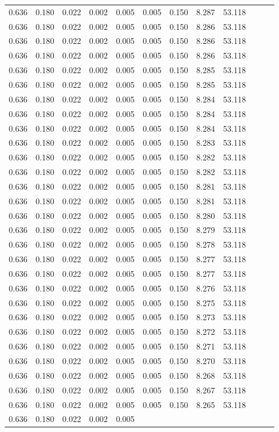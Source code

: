\begin{longtable}{rrrrrrrrrrrr}
    0.636 & 0.180 & 0.022 & 0.002 & 0.005 & 0.005 & 0.150 & 8.287 & 53.118 \\0.636 & 0.180 & 0.022 & 0.002 & 0.005 & 0.005 & 0.150 & 8.286 & 53.118 \\0.636 & 0.180 & 0.022 & 0.002 & 0.005 & 0.005 & 0.150 & 8.286 & 53.118 \\0.636 & 0.180 & 0.022 & 0.002 & 0.005 & 0.005 & 0.150 & 8.286 & 53.118 \\0.636 & 0.180 & 0.022 & 0.002 & 0.005 & 0.005 & 0.150 & 8.285 & 53.118 \\0.636 & 0.180 & 0.022 & 0.002 & 0.005 & 0.005 & 0.150 & 8.285 & 53.118 \\0.636 & 0.180 & 0.022 & 0.002 & 0.005 & 0.005 & 0.150 & 8.284 & 53.118 \\0.636 & 0.180 & 0.022 & 0.002 & 0.005 & 0.005 & 0.150 & 8.284 & 53.118 \\0.636 & 0.180 & 0.022 & 0.002 & 0.005 & 0.005 & 0.150 & 8.284 & 53.118 \\0.636 & 0.180 & 0.022 & 0.002 & 0.005 & 0.005 & 0.150 & 8.283 & 53.118 \\0.636 & 0.180 & 0.022 & 0.002 & 0.005 & 0.005 & 0.150 & 8.282 & 53.118 \\0.636 & 0.180 & 0.022 & 0.002 & 0.005 & 0.005 & 0.150 & 8.282 & 53.118 \\0.636 & 0.180 & 0.022 & 0.002 & 0.005 & 0.005 & 0.150 & 8.281 & 53.118 \\0.636 & 0.180 & 0.022 & 0.002 & 0.005 & 0.005 & 0.150 & 8.281 & 53.118 \\0.636 & 0.180 & 0.022 & 0.002 & 0.005 & 0.005 & 0.150 & 8.280 & 53.118 \\0.636 & 0.180 & 0.022 & 0.002 & 0.005 & 0.005 & 0.150 & 8.279 & 53.118 \\0.636 & 0.180 & 0.022 & 0.002 & 0.005 & 0.005 & 0.150 & 8.278 & 53.118 \\0.636 & 0.180 & 0.022 & 0.002 & 0.005 & 0.005 & 0.150 & 8.277 & 53.118 \\0.636 & 0.180 & 0.022 & 0.002 & 0.005 & 0.005 & 0.150 & 8.277 & 53.118 \\0.636 & 0.180 & 0.022 & 0.002 & 0.005 & 0.005 & 0.150 & 8.276 & 53.118 \\0.636 & 0.180 & 0.022 & 0.002 & 0.005 & 0.005 & 0.150 & 8.275 & 53.118 \\0.636 & 0.180 & 0.022 & 0.002 & 0.005 & 0.005 & 0.150 & 8.273 & 53.118 \\0.636 & 0.180 & 0.022 & 0.002 & 0.005 & 0.005 & 0.150 & 8.272 & 53.118 \\0.636 & 0.180 & 0.022 & 0.002 & 0.005 & 0.005 & 0.150 & 8.271 & 53.118 \\0.636 & 0.180 & 0.022 & 0.002 & 0.005 & 0.005 & 0.150 & 8.270 & 53.118 \\0.636 & 0.180 & 0.022 & 0.002 & 0.005 & 0.005 & 0.150 & 8.268 & 53.118 \\0.636 & 0.180 & 0.022 & 0.002 & 0.005 & 0.005 & 0.150 & 8.267 & 53.118 \\0.636 & 0.180 & 0.022 & 0.002 & 0.005 & 0.005 & 0.150 & 8.265 & 53.118 \\0.636 & 0.180 & 0.022 & 0.002 & 0.005 
\end{longtable}
